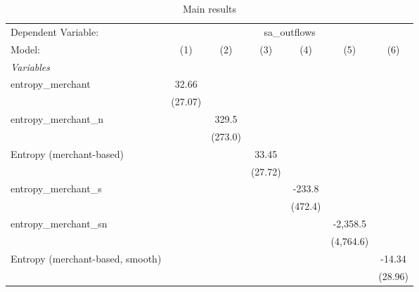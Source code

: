 
\begin{table}[htbp]
   \centering
   \caption{\label{tab:reg_sa_outflows_merchant.tex} Main results}
   \begin{footnotesize}
      \begin{tabular}{lcccccc}
         \tabularnewline\midrule\midrule
         Dependent Variable: & \multicolumn{6}{c}{sa\_outflows}\\
         Model:                           & (1)           & (2)           & (3)           & (4)           & (5)           & (6)\\
         \midrule \emph{Variables} &   &   &   &   &   &  \\
         entropy\_merchant               & 32.66         &               &               &               &               &   \\
                                          & (27.07)       &               &               &               &               &   \\
         entropy\_merchant\_n           &               & 329.5         &               &               &               &   \\
                                          &               & (273.0)       &               &               &               &   \\
         Entropy (merchant-based)         &               &               & 33.45         &               &               &   \\
                                          &               &               & (27.72)       &               &               &   \\
         entropy\_merchant\_s           &               &               &               & -233.8        &               &   \\
                                          &               &               &               & (472.4)       &               &   \\
         entropy\_merchant\_sn          &               &               &               &               & -2,358.5      &   \\
                                          &               &               &               &               & (4,764.6)     &   \\
         Entropy (merchant-based, smooth) &               &               &               &               &               & -14.34\\
                                          &               &               &               &               &               & (28.96)\\

\end{tabular}
\end{footnotesize}
\end{table}
